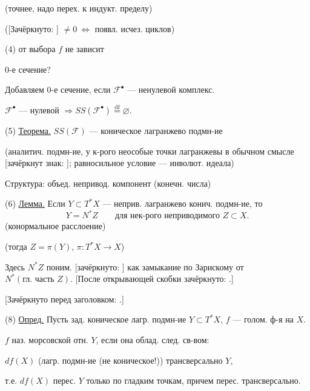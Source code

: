 (точнее, надо перех. к индукт. пределу)

([Зачёркнуто: ]
$\ne0\ \Longleftrightarrow$ появл. исчез. циклов)

(4) от выбора $f$ не зависит

0-е сечение?

Добавляем 0-е сечение, если $\mathcal{F}^{\bullet}$ — ненулевой комплекс.

$\mathcal{F}^{\bullet}$ — нулевой
$\Rightarrow SS(\mathcal{F}^{\bullet})\overset{\mathrm{df}}{=}\varnothing$.



(5) \underline{Теорема.}
$SS(\mathcal{F})$ — коническое лагранжево подмн-ие

(аналитич. подмн-ие, у к-рого неособые точки лагранжевы в
обычном смысле [зачёркнут знак: ];
равносильное условие — инволют. идеала)

Структура: объед. непривод. компонент (конечн. числа)

(6) \underline{Лемма.}
Если $Y\subset T^{*}X$ — неприв. лагранжево
конич. подмн-ие, то
\begin{equation*}
Y=N^{*}Z\qquad
\text{для нек-рого неприводимого }Z\subset X. \tag{7}
\end{equation*}
(конормальное расслоение)

(тогда $Z=\pi(Y)$, $\pi:T^{*}X\longrightarrow X$)

Здесь $N^{*}Z$ поним.
[зачёркнуто: ]
как замыкание по Зарискому от
$N^{*}(\text{гл. часть }Z)$.
[После открывающей скобки зачёркнуто: .]

[Зачёркнуто перед заголовком: .]

(8) \underline{Опред.}
Пусть зад. коническое лагр. подмн-ие $Y\subset T^{*}X$,
$f$ — голом. ф-я на $X$.

$f$ наз. морсовской отн. $Y$, если она облад. след. св-вом:

$df(X)$ (лагр. подмн-ие (не коническое!)) трансверсально $Y$,

т.е. $df(X)$ перес. $Y$ только по гладким точкам, причем
перес. трансверсально.

